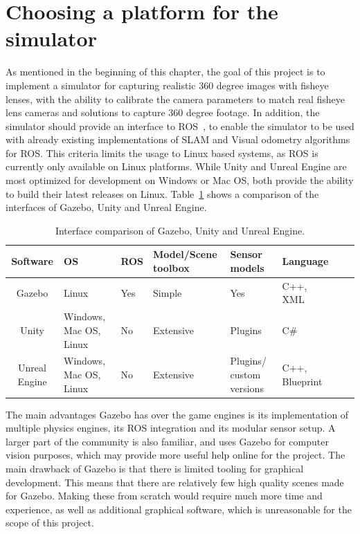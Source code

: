 \section{Choosing a platform for the simulator} \label{sec:Chooseplatform}

As mentioned in the beginning of this chapter, the goal of this project is to implement a simulator for capturing realistic 360 degree images with fisheye lenses, with the ability to calibrate the camera parameters to match real fisheye lens cameras and solutions to capture 360 degree footage. In addition, the simulator should provide an interface to ROS~\cite{ROSpaper}, to enable the simulator to be used with already existing implementations of SLAM and Visual odometry algorithms for ROS. This criteria limits the usage to Linux based systems, as ROS is currently only available on Linux platforms. While Unity and Unreal Engine are most optimized for development on Windows or Mac OS, both provide the ability to build their latest releases on Linux. Table~\ref{tab:comparison_interface} shows a comparison of the interfaces of Gazebo, Unity and Unreal Engine.

\begin{table}[!htb]
    \centering
    \caption{Interface comparison of Gazebo, Unity and Unreal Engine.}
    \label{tab:comparison_interface}
    \begin{tabular}{|c|>{\centering\arraybackslash}m{2cm}|>{\centering\arraybackslash}m{2cm}|>{\centering\arraybackslash}m{2.8cm}|>{\centering\arraybackslash}m{2cm}|>{\centering\arraybackslash}m{2cm}|>{\centering\arraybackslash}m{2cm}|>{\centering\arraybackslash}m{2cm}|} \hline
        \textbf{Software}          & \textbf{OS}  & \textbf{ROS} & \textbf{Model/Scene toolbox}   & \textbf{Sensor models} & \textbf{Language}              \\ \hline \hline
        Gazebo          & Linux           & Yes           & Simple  & Yes & C++, XML                 \\ \hline
        Unity           & Windows, Mac OS, Linux                    & No            & Extensive & Plugins & C\# \\ \hline
        Unreal Engine   & Windows, Mac OS, Linux  & No            & Extensive & Plugins/ custom versions & C++, Blueprint \\ \hline
    \end{tabular}
\end{table}

The main advantages Gazebo has over the game engines is its implementation of multiple physics engines, its ROS integration and its modular sensor setup. A larger part of the community is also familiar, and uses Gazebo for computer vision purposes, which may provide more useful help online for the project. The main drawback of Gazebo is that there is limited tooling for graphical development. This means that there are relatively few high quality scenes made for Gazebo. Making these from scratch would require much more time and experience, as well as additional graphical software, which is unreasonable for the scope of this project. 

